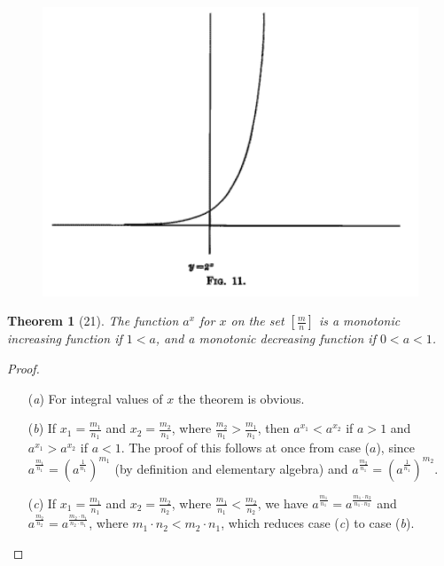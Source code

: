 \documentclass[a4paper,12pt]{book}[2004/02/16]
\providecommand{\colorbox}[2]{#2}
\newcommand{\correction}[2]{\colorbox{corr}{#1}}
\providecommand{\hypertarget}[2]{#2}
\theoremstyle{ilemma}
\theoremstyle{itheorem}
\newtheorem{theorem}{Theorem}
\theoremstyle{iother}
\theoremstyle{icorollary}
\theoremstyle{numcorollary}
\theoremstyle{idefinition}
\renewcommand{\dfrac}[2]{\frac{#1}{#2}}%
\begin{document}
\begin{figure}[!hbtp]\label{fig11}\hypertarget{fig11}{}
\centering
\includegraphics{images/fig11}
\end{figure}

\begin{theorem}[21]\hypertarget{thm21}{}
The function $a^x$ for $x$ on the set $\left[ \dfrac{m}{n} \right]$ is
a monotonic increasing function if $1<a$, and a monotonic decreasing
function if $0<a<1$.
\end{theorem}

\begin{proof}\begin{enumerate}
\item[(\textit{a})]For integral values of $x$ the theorem is obvious.
\item[(\textit{b})] If $x_1=\dfrac{m_1}{n_1}$ and
$x_2=\dfrac{m_2}{n_1}$, where $\dfrac{m_2}{n_1} > \dfrac{m_1}{n_1}$,
then
$a^{x_1}<a^{x_2}$ if $a>1$ and $a^{x_1}>a^{x_2}$ if $a<1$. The proof
of this follows at once from case ($a$), since
$a^\frac{m_1}{n_1}=\left(a^\frac{1}{n_1}\right)^{m_1}$ (by definition
and elementary algebra) and
$a^\frac{m_2}{n_1}=\left({a^\frac{1}{n_1}}\right)^{m_2}$.
\item[(\textit{c})] If $x_1=\dfrac{m_1}{n_1}$ and
$x_2=\dfrac{m_2}{n_2}$, where $\dfrac{m_1}{n_1}<\dfrac{m_2}{n_2}$, we
have $a^\frac{m_1}{n_1}=a^\frac{m_1{\cdot}n_2}{n_1{\cdot}n_2}$ and
$a^\frac{m_2}{n_2}=a^\frac{m_2{\cdot}n_1}{n_2{\cdot}n_1}$, where
$m_1{\cdot}n_2\text{\correction{$<$}{$>$}}m_2{\cdot}n_1$, which reduces case (\emph{c}) to case
(\emph{b}).\qedhere
\end{enumerate}
\end{proof}
\end{document}
